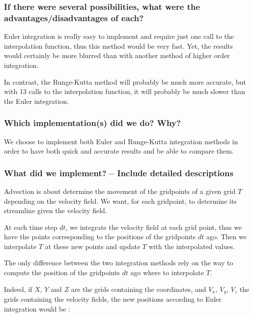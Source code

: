\documentclass[accepted,single]{gipaper}
\begin{document}
\subsubsection{If there were several possibilities,
what were the advantages/disadvantages of each? }

Euler integration is really easy to implement and require just one call to the interpolation function, thus this method would be very fast. Yet, the results would certainly be more blurred than with another method of higher order integration.

In contrast, the Runge-Kutta method will probably be much more accurate, but with 13 calls to the interpolation function, it will probably be much slower than the Euler integration.

\subsubsection{Which implementation(s) did we do? Why?}

We choose to implement both Euler and Runge-Kutta integration methods in order to have both quick and accurate results and be able to compare them.

\subsubsection{What did we implement? -- Include detailed descriptions}

Advection is about determine the movement of the gridpoints of a given grid $T$ depending on the velocity field. We want, for each gridpoint, to determine its streamline given the velocity field. 

At each time step $dt$, we integrate the velocity field at each grid point, thus we have the points corresponding to the positions of the gridpoints $dt$ ago. Then we interpolate $T$ at these new points and update $T$  with the interpolated values.

The only difference between the two integration methods rely on the way to compute the position of the gridpoints $dt$ ago where to interpolate $T$. 

Indeed, if $X$, $Y$ and $Z$ are the grids containing the coordinates, and $V_x$, $V_y$, $V_z$ the grids containing the velocity fields, the new positions according to Euler integration would be :
\end{document}
